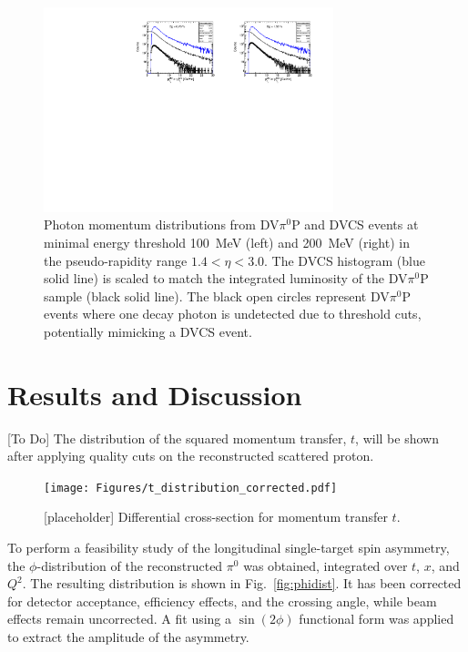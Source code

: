 \documentclass[letterpaper,12pt]{article}
\begin{document}
\begin{figure}[h]
    \centering
    \includegraphics[width=0.75\textwidth]{Figures/hGammasMomMC2DVCS.pdf}
    \caption{Photon momentum distributions from DV$\pi^{0}$P and DVCS events at minimal energy threshold 100~MeV (left) and 200~MeV (right) in the pseudo-rapidity range $1.4 < \eta < 3.0$. The DVCS histogram (blue solid line) is scaled to match the integrated luminosity of the DV$\pi^{0}$P sample (black solid line). The black open circles represent DV$\pi^{0}$P events where one decay photon is undetected due to threshold cuts, potentially mimicking a DVCS event.}
\label{fig:gamma_dist}
\end{figure}

\pagebreak
\section{Results and Discussion}\label{sec:Results_Discuss}
[To Do] The distribution of the squared momentum transfer, $t$, will be shown after applying quality cuts on the reconstructed scattered proton.

\begin{figure}[ht]
    \centering
    \texttt{[image: Figures/t\_distribution\_corrected.pdf]}
    \caption{[placeholder] Differential cross-section for momentum transfer $t$.}
\label{fig:tdist}
\end{figure}

To perform a feasibility study of the longitudinal single-target spin asymmetry, the $\phi$-distribution of the reconstructed $\pi^{0}$ was obtained, integrated over $t$, $x$, and $Q^{2}$. The resulting distribution is shown in Fig.~\ref{fig:phidist}. It has been corrected for detector acceptance, efficiency effects, and the crossing angle, while beam effects remain uncorrected. A fit using a $\sin(2\phi)$ functional form was applied to extract the amplitude of the asymmetry.
\end{document}
